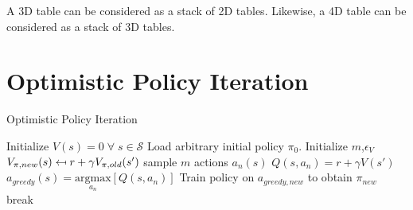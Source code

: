 A 3D table can be considered as a stack of 2D tables. Likewise, a 4D table can be considered as a stack of 3D tables.\newpage

\section{Optimistic Policy Iteration}
\label{appendix_D}

\begin{algorithm}
	\caption{Optimistic Policy Iteration}
	\begin{algorithmic}[0] %
		\State
		\State Initialize $V(s) = 0 \; \forall \; s \in \mathcal{S}$
		\State Load arbitrary initial policy $\pi_0$.
		\State Initialize $m$,\;$\epsilon_V$
		\State
		\State $V_{\pi,new}(s) \mathrel{\reflectbox{\ensuremath{\mapsto}}} r+\gamma V_ {\pi,old}(s')$
		\EndFor
		\EndFunction
		\State
		\State sample $m$ actions $a_n(s)$
		\State $Q(s,a_n) = r + \gamma V(s')$
		\EndFor
		\State $a_{greedy}(s)=\underset{a_n}{\text{argmax}}[Q(s,a_n)]$
		\EndFor
		\EndFunction
			\State Train policy on $a_{greedy,new}$ to obtain $\pi_{new}$
		\State
		\State break
		\EndIf	
		\EndWhile
		\State
		\EndFunction
	\end{algorithmic}
	\label{algo:opi}
\end{algorithm}


